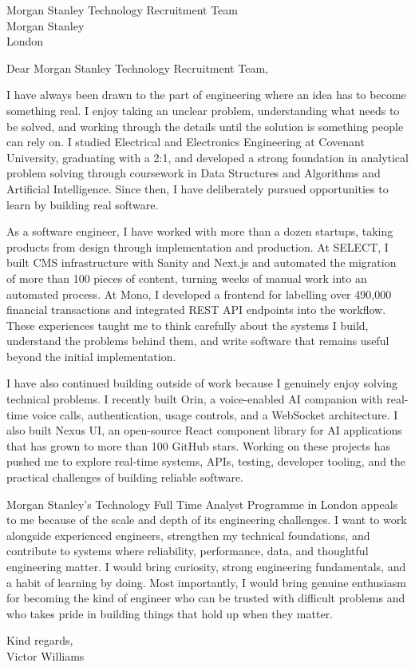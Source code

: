 \documentclass{resume}
\newcommand{\company}{Morgan Stanley}
\newcommand{\hiringmanager}{Morgan Stanley Technology Recruitment Team}
\begin{document}

\vspace{0.8em}
\noindent
\hiringmanager \\
\company \\
London

\vspace{0.7em}
\noindent Dear \hiringmanager,

I have always been drawn to the part of engineering where an idea has to become something real. I enjoy taking an unclear problem, understanding what needs to be solved, and working through the details until the solution is something people can rely on. I studied Electrical and Electronics Engineering at Covenant University, graduating with a 2:1, and developed a strong foundation in analytical problem solving through coursework in Data Structures and Algorithms and Artificial Intelligence. Since then, I have deliberately pursued opportunities to learn by building real software.

As a software engineer, I have worked with more than a dozen startups, taking products from design through implementation and production. At SELECT, I built CMS infrastructure with Sanity and Next.js and automated the migration of more than 100 pieces of content, turning weeks of manual work into an automated process. At Mono, I developed a frontend for labelling over 490,000 financial transactions and integrated REST API endpoints into the workflow. These experiences taught me to think carefully about the systems I build, understand the problems behind them, and write software that remains useful beyond the initial implementation.

I have also continued building outside of work because I genuinely enjoy solving technical problems. I recently built Orin, a voice-enabled AI companion with real-time voice calls, authentication, usage controls, and a WebSocket architecture. I also built Nexus UI, an open-source React component library for AI applications that has grown to more than 100 GitHub stars. Working on these projects has pushed me to explore real-time systems, APIs, testing, developer tooling, and the practical challenges of building reliable software.

Morgan Stanley's Technology Full Time Analyst Programme in London appeals to me because of the scale and depth of its engineering challenges. I want to work alongside experienced engineers, strengthen my technical foundations, and contribute to systems where reliability, performance, data, and thoughtful engineering matter. I would bring curiosity, strong engineering fundamentals, and a habit of learning by doing. Most importantly, I would bring genuine enthusiasm for becoming the kind of engineer who can be trusted with difficult problems and who takes pride in building things that hold up when they matter.

\vspace{0.8em}
\noindent Kind regards, \\[0.6em]
Victor Williams
\end{document}
